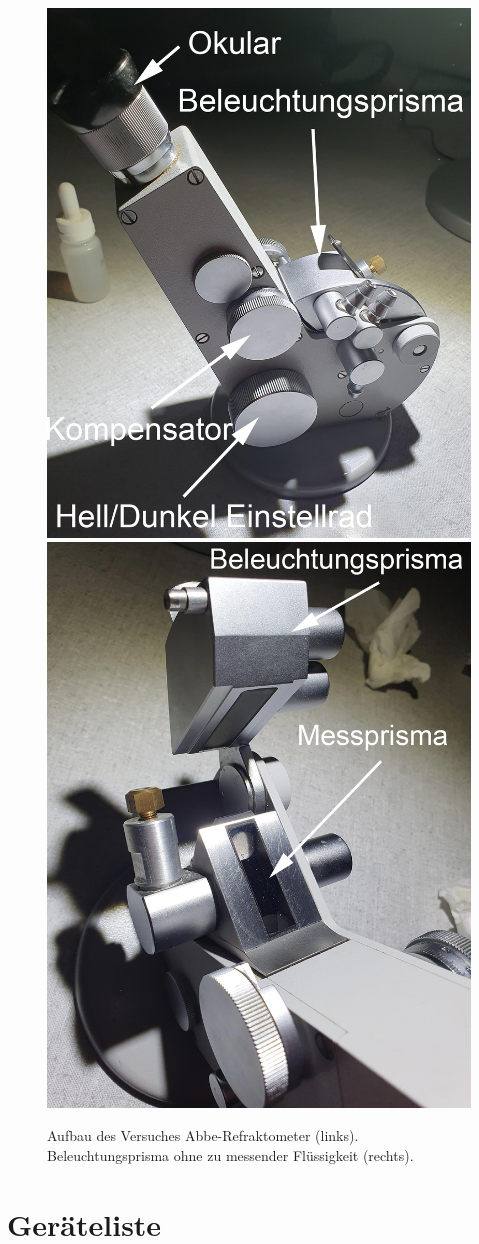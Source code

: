 \documentclass[12pt,a4paper,twoside]{article}
\begin{document}
\begin{figure}[H]
    \centering
    \includegraphics[width=0.4\linewidth]{nudes/abbe.jpg}
    \includegraphics[width=0.4\linewidth]{nudes/abbe2.jpg}
    \caption{Aufbau des Versuches Abbe-Refraktometer (links). Beleuchtungsprisma ohne zu messender Flüssigkeit (rechts). }
    \label{fig:abbe}
\end{figure}



\section{Geräteliste} %
\end{document}
